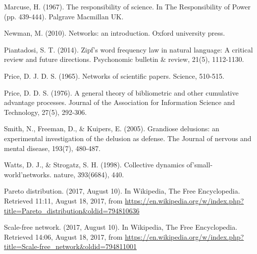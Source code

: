 \documentclass[12pt,fleqn]{article}
\begin{document}
\begin{thebibliography}{99}
Marcuse, H. (1967). The responsibility of science. In The Responsibility of Power (pp. 439-444). Palgrave Macmillan UK.

Newman, M. (2010). Networks: an introduction. Oxford university press.

Piantadosi, S. T. (2014). Zipf’s word frequency law in natural language: A critical review and future directions. Psychonomic bulletin \& review, 21(5), 1112-1130.

Price, D. J. D. S. (1965). Networks of scientific papers. Science, 510-515.

Price, D. D. S. (1976). A general theory of bibliometric and other cumulative advantage processes. Journal of the Association for Information Science and Technology, 27(5), 292-306.

Smith, N., Freeman, D., \& Kuipers, E. (2005). Grandiose delusions: an experimental investigation of the delusion as defense. The Journal of nervous and mental disease, 193(7), 480-487.

Watts, D. J., \& Strogatz, S. H. (1998). Collective dynamics of'small-world'networks. nature, 393(6684), 440.

Pareto distribution. (2017, August 10). In Wikipedia, The Free Encyclopedia. Retrieved 11:11, August 18, 2017, from \url{https://en.wikipedia.org/w/index.php?title=Pareto_distribution&oldid=794810636}

Scale-free network. (2017, August 10). In Wikipedia, The Free Encyclopedia. Retrieved
14:06, August 18, 2017, from \url{https://en.wikipedia.org/w/index.php?title=Scale-free_network&oldid=794811001}
\end{thebibliography}





\end{document}
